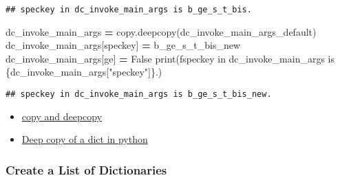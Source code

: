 \documentclass[
]{book}
\newenvironment{Shaded}{\begin{snugshade}}{\end{snugshade}}
\newcommand{\BuiltInTok}[1]{#1}
\newcommand{\NormalTok}[1]{#1}
\newcommand{\OperatorTok}[1]{\textcolor[rgb]{0.81,0.36,0.00}{\textbf{#1}}}
\newcommand{\SpecialCharTok}[1]{\textcolor[rgb]{0.00,0.00,0.00}{#1}}
\newcommand{\SpecialStringTok}[1]{\textcolor[rgb]{0.31,0.60,0.02}{#1}}
\newcommand{\StringTok}[1]{\textcolor[rgb]{0.31,0.60,0.02}{#1}}
\newcommand{\VariableTok}[1]{\textcolor[rgb]{0.00,0.00,0.00}{#1}}
\providecommand{\tightlist}{%
  \setlength{\itemsep}{0pt}\setlength{\parskip}{0pt}}
\begin{document}
\begin{verbatim}
## speckey in dc_invoke_main_args is b_ge_s_t_bis.
\end{verbatim}

\begin{Shaded}
\begin{Highlighting}[]
\NormalTok{dc\_invoke\_main\_args }\OperatorTok{=}\NormalTok{ copy.deepcopy(dc\_invoke\_main\_args\_default)}
\NormalTok{dc\_invoke\_main\_args[}\StringTok{\textquotesingle{}speckey\textquotesingle{}}\NormalTok{] }\OperatorTok{=} \StringTok{\textquotesingle{}b\_ge\_s\_t\_bis\_new\textquotesingle{}}
\NormalTok{dc\_invoke\_main\_args[}\StringTok{\textquotesingle{}ge\textquotesingle{}}\NormalTok{] }\OperatorTok{=} \VariableTok{False}
\BuiltInTok{print}\NormalTok{(}\SpecialStringTok{f\textquotesingle{}speckey in dc\_invoke\_main\_args is }\SpecialCharTok{\{}\NormalTok{dc\_invoke\_main\_args[}\StringTok{"speckey"}\NormalTok{]}\SpecialCharTok{\}}\SpecialStringTok{.\textquotesingle{}}\NormalTok{)}
\end{Highlighting}
\end{Shaded}

\begin{verbatim}
## speckey in dc_invoke_main_args is b_ge_s_t_bis_new.
\end{verbatim}

\begin{itemize}
\tightlist
\item
  \href{https://docs.python.org/2/library/copy.html}{copy and deepcopy}
\item
  \href{https://stackoverflow.com/questions/5105517/deep-copy-of-a-dict-in-python}{Deep copy of a dict in python}
\end{itemize}

\hypertarget{create-a-list-of-dictionaries-1}{%
\subsubsection{Create a List of Dictionaries}\label{create-a-list-of-dictionaries-1}}
\end{document}
